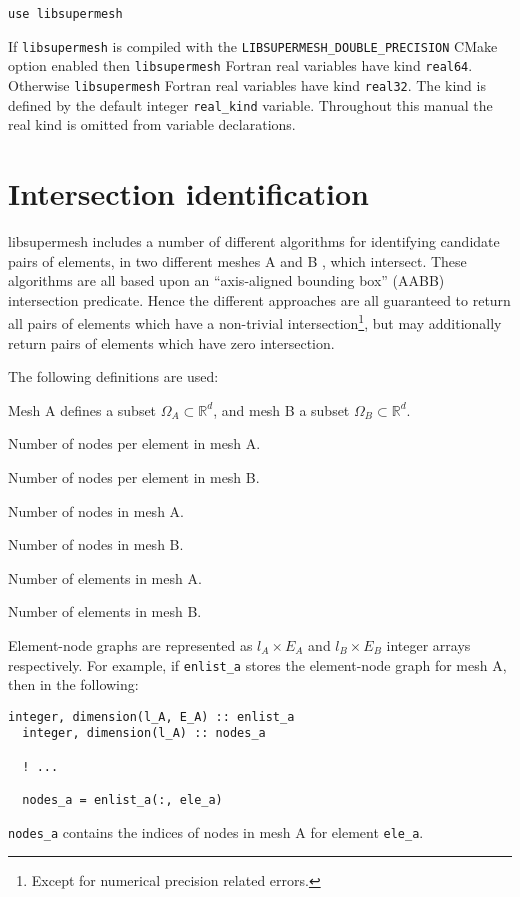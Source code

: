 \documentclass{article}
\begin{document}
\begin{lstlisting}[language=FORTRAN]
  use libsupermesh
\end{lstlisting}

If \verb+libsupermesh+ is compiled with the \verb+LIBSUPERMESH_DOUBLE_PRECISION+
CMake option enabled then \verb+libsupermesh+ Fortran real variables have kind
\verb+real64+. Otherwise \verb+libsupermesh+ Fortran real variables have kind
\verb+real32+. The kind is defined by the default integer \verb+real_kind+
variable. Throughout this manual the real kind is omitted from variable
declarations.

\section{Intersection identification}

libsupermesh includes a number of different algorithms for identifying candidate
pairs of elements, in two different meshes A and B , which intersect. These
algorithms are all based upon an ``axis-aligned bounding box'' (AABB)
intersection predicate. Hence the different approaches are all guaranteed to
return all pairs of elements which have a non-trivial
intersection\footnote{Except for numerical precision related errors.}, but may
additionally return pairs of elements which have zero intersection.

The following definitions are used:
\begin{description}[leftmargin=\parindent,labelindent=\parindent]
  \item[$d$] Mesh A defines a subset $\Omega_A \subset \mathbb{R}^d$, and mesh B
    a subset $\Omega_B \subset \mathbb{R}^d$.
  \item[$l_A$] Number of nodes per element in mesh A.
  \item[$l_B$] Number of nodes per element in mesh B.
  \item[$V_A$] Number of nodes in mesh A.
  \item[$V_B$] Number of nodes in mesh B.
  \item[$E_A$] Number of elements in mesh A.
  \item[$E_B$] Number of elements in mesh B.
\end{description}

Element-node graphs are represented as $l_A \times E_A$ and
$l_B \times E_B$ integer arrays respectively. For example, if \verb+enlist_a+
stores the element-node graph for mesh A, then in the following:
\begin{lstlisting}[language=FORTRAN]
  integer, dimension(l_A, E_A) :: enlist_a
  integer, dimension(l_A) :: nodes_a
  
  ! ...

  nodes_a = enlist_a(:, ele_a)
\end{lstlisting}
\verb+nodes_a+ contains the indices of nodes in mesh A for element \verb+ele_a+.
\end{document}

